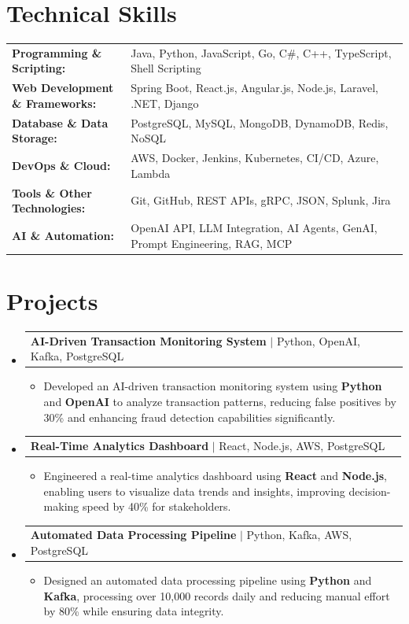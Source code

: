 \documentclass[letterpaper,10pt]{article}
\makeatletter
\newcommand{\resumeItem}[1]{
  \item{\fontsize{8pt}{9pt}\selectfont
    #1 \vspace{-3pt}
  }
}
\newcommand{\resumeProjectHeading}[2]{
    \item
    \begin{tabular*}{1.001\textwidth}{l@{\extracolsep{\fill}}r}
      \fontsize{8.5pt}{10pt}#1 & \textbf{\fontsize{8.5pt}{10pt} #2}\\
    \end{tabular*}\vspace{-7pt}
}
\newcommand{\resumeSubHeadingListStart}{\begin{itemize}[leftmargin=0pt, label={}]}
\newcommand{\resumeSubHeadingListEnd}{\end{itemize}}
\newcommand{\resumeItemListStart}{\begin{itemize}[leftmargin=*]}
\newcommand{\resumeItemListEnd}{\end{itemize}\vspace{-5pt}}
\makeatother
\begin{document}
\section{Technical Skills}
        \vspace{-14pt}
        \begin{table}[h]
            \fontsize{8pt}{9pt}\selectfont
            \begin{tabular}{p{0.3\linewidth} p{0.7\linewidth}}
                \textbf{Programming \& Scripting:} & Java, Python, JavaScript, Go, C\#, C++, TypeScript, Shell Scripting \\
                \textbf{Web Development \& Frameworks:} & Spring Boot, React.js, Angular.js, Node.js, Laravel, .NET, Django \\
                \textbf{Database \& Data Storage:} & PostgreSQL, MySQL, MongoDB, DynamoDB, Redis, NoSQL \\
                \textbf{DevOps \& Cloud:} & AWS, Docker, Jenkins, Kubernetes, CI/CD, Azure, Lambda \\
                \textbf{Tools \& Other Technologies:} & Git, GitHub, REST APIs, gRPC, JSON, Splunk, Jira \\
                \textbf{AI \& Automation:} & OpenAI API, LLM Integration, AI Agents, GenAI, Prompt Engineering, RAG, MCP \\
            \end{tabular}
        \end{table}
 \vspace{-18pt}

\section{Projects}
    \vspace{-5pt}
    \resumeSubHeadingListStart
          \resumeProjectHeading
            {\textbf{AI-Driven Transaction Monitoring System} $|$ Python, OpenAI, Kafka, PostgreSQL}{}
            \resumeItemListStart
                \resumeItem{Developed an AI-driven transaction monitoring system using \textbf{Python} and \textbf{OpenAI} to analyze transaction patterns, reducing false positives by 30\% and enhancing fraud detection capabilities significantly.}
            \resumeItemListEnd
        \vspace{-12pt}
    
        \resumeProjectHeading
            {\textbf{Real-Time Analytics Dashboard} $|$ React, Node.js, AWS, PostgreSQL}{}
        \resumeItemListStart
                \resumeItem{Engineered a real-time analytics dashboard using \textbf{React} and \textbf{Node.js}, enabling users to visualize data trends and insights, improving decision-making speed by 40\% for stakeholders.}
        \resumeItemListEnd
      \vspace{-12pt}
      \resumeProjectHeading
        {\textbf{Automated Data Processing Pipeline} $|$ Python, Kafka, AWS, PostgreSQL}{}
    \resumeItemListStart
            \resumeItem{Designed an automated data processing pipeline using \textbf{Python} and \textbf{Kafka}, processing over 10,000 records daily and reducing manual effort by 80\% while ensuring data integrity.}
    \resumeItemListEnd
    \resumeSubHeadingListEnd
\end{document}
